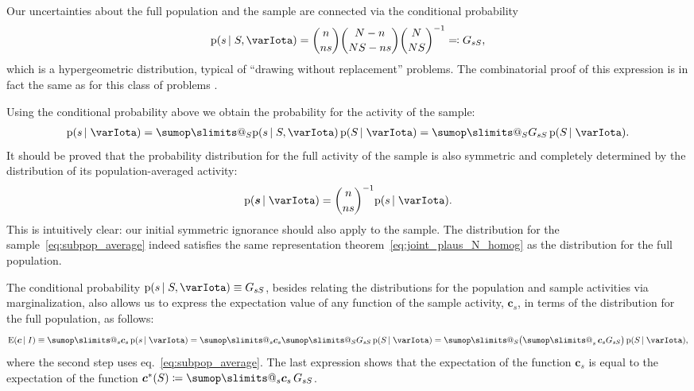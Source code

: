 \documentclass[\ifafour a4paper,12pt,\else a5paper,10pt,\fi%
onecolumn,oneside,article,%
british%
]{memoir}
\makeatletter
\theoremstyle{remark}
\theoremstyle{innote}
\def\sum{\DOTSI\sumop\slimits@}
\newcommand*{\citep}{\parencites}
\newcommand*{\defd}{\coloneqq}
\newcommand*{\defs}{\eqqcolon}
\newcommand*{\pf}{\mathrm{p}}%
\newcommand*{\p}{\mathrm{P}}%
\newcommand*{\E}{\mathrm{E}}
\renewcommand*{\|}{\nonscript\,\vert\nonscript\;\mathopen{}}
\newcommand*{\sect}{\S}%
\newcommand*{\chap}{ch.}%
\newcommand*{\eqn}{eq.}%
\newcommand*{\tsum}{\mathop{\textstyle\sum}\nolimits}
\newcommand*{\ypp}{G}
\newcommand*{\yRv}{S}
\newcommand*{\yrv}{s}
\newcommand*{\yNv}{N}
\newcommand*{\yr}{\bm{\yrv}}%
\newcommand*{\yrs}{\yrv}%
\newcommand*{\yRf}{\yRv}%
\newcommand*{\yH}{\varIota}
\newcommand*{\yg}{\bm{c}}
\makeatother
\begin{document}
Our uncertainties about the full population and the sample are connected
via the conditional probability
\begin{equation}
  \label{eq:conditional_hypergeometric}
  \pf(\yrs \|\yRf, \yH)=
  \binom{n}{n\yrs}\binom{\yNv-n}{\yNv \yRf-n\yrs}\binom{\yNv}{\yNv \yRf}^{-1}
  \defs \ypp_{\yrs\yRf},
\end{equation}
which is a hypergeometric distribution, typical of \enquote{drawing without
  replacement} problems. The combinatorial proof of this expression is in
fact the same as for this class of problems
\citep[\chap~3]{jaynes1994_r2003}[\sect~4.8.3]{ross1976_r2010}[\sect~II.6]{feller1950_r1968}.

Using the conditional probability above we obtain the probability for the
activity of the sample:
\begin{gather}
  \label{eq:subpop_average}
  \pf(\yrs \| \yH) = \sum_{\yRf}
  \pf(\yrs \|\yRf, \yH)\,
  \pf(\yRf \| \yH)
  = 
  \sum_{\yRf}
  \ypp_{\yrs\yRf}\,
  \pf(\yRf \| \yH).
\end{gather}
It should be proved that the probability distribution for the full activity
of the sample is also symmetric and completely determined by the
distribution of its population-averaged activity:
\begin{equation}
  \label{eq:marginal}
  \pf(\yr \| \yH) = \binom{n}{n\yrs}^{-1} \pf(\yrs \| \yH).
\end{equation}
This is intuitively clear: our initial symmetric ignorance should also
apply to the sample. The distribution for the
sample~\eqref{eq:subpop_average} indeed satisfies the same representation
theorem~\eqref{eq:joint_plaus_N_homog} as the distribution for the full
population.

The conditional probability
$\pf(\yrs \|\yRf, \yH) \equiv \ypp_{\yrs \yRf}$, besides
relating the distributions for the population and sample activities via
marginalization, also allows us to express the expectation value of any
function of the sample activity, $\yg_{\yrs}$, in terms of the distribution
for the full population, as follows:
\begin{equation}
  \label{eq:pullback_P}
  \E(\yg\|I)
  \equiv
  \sum_{\yrs} \yg_{\yrs}\,\pf(\yrs \| \yH)
  =
  \sum_{\yrs} \yg_{\yrs} \sum_{\yRf} \ypp_{\yrs\yRf}\,\pf(\yRf \| \yH)
  =%
  \sum_{\yRf} \bigl( \tsum_{\yrs} \yg_{\yrs}  \ypp_{\yrs\yRf} \bigr)\,
  \pf(\yRf \| \yH),
\end{equation}
where the second step uses \eqn~\eqref{eq:subpop_average}. The last
expression shows that the expectation of the function $\yg_{\yrs}$ is equal to
the expectation of the function
$\yg^*(\yRf) \defd \sum_{\yrs} \yg_{\yrs}\,\ypp_{\yrs\yRf}$.
\end{document}
